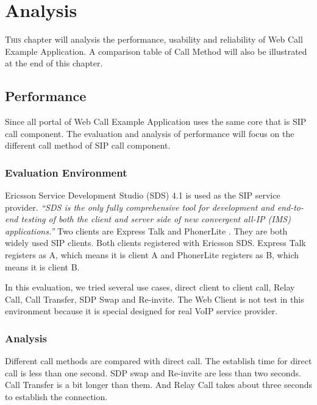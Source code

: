 
\chapter{Analysis}
\label{sec:Analysis}

\lettrine[lines=3]{T}{his} chapter will analysis the performance, usability and reliability of \textsf{Web Call Example Application}. A comparison table of Call Method will also be illustrated at the end of this chapter.

\section{Performance}

Since all portal of Web Call Example Application uses the same core that is \textsf{SIP call component}. The evaluation and analysis of performance will focus on the different call method of SIP call component.

\subsection{Evaluation Environment}

\textsf{Ericsson Service Development Studio (SDS)} 4.1 \cite{SDS4} is used as the SIP service provider. \textit{``SDS is the only fully comprehensive tool for development and end-to-end testing of both the client and server side of new convergent all-IP (IMS) applications.''} \cite{SDS4} Two clients are Express Talk \cite{ExpressTalkHomepage} and PhonerLite \cite{PhonerLiteHomepage}. They are both widely used SIP clients. Both clients registered with Ericsson SDS. Express Talk registers as A, which means it is client A and PhonerLite registers as B, which means it is client B.

In this evaluation, we tried several use cases, direct client to client call, \textsf{Relay Call}, \textsf{Call Transfer}, \textsf{SDP Swap} and \textsf{Re-invite}. The \textsf{Web Client} is not test in this environment because it is special designed for real VoIP service provider.

\subsection{Analysis}

Different call methods are compared with direct call. The establish time for direct call is less than one second. \textsf{SDP swap} and \textsf{Re-invite} are less than two seconds. \textsf{Call Transfer} is a bit longer than them. And \textsf{Relay Call} takes about three seconds to establish the connection.

